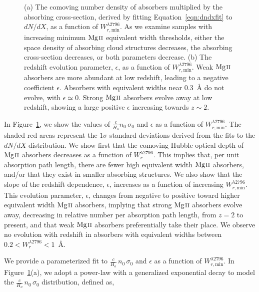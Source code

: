 \documentclass[iop,apj,numberedappendix,appendixfloats,twocolappendix]{emulateapj}
\begin{document}
\begin{figure*}[bth]
\caption{(a) The comoving number density of absorbers multiplied by the absorbing cross-section, derived by fitting Equation~\ref{eqn:dndxfit} to $dN\!/dX$, as a function of $W_{r,\mathrm{min}}^{\lambda2796}$. As we examine samples with increasing minimum ${\hbox{{\rm Mg}\kern 0.1em{\sc ii}}}$ equivalent width thresholds, either the space density of absorbing cloud structures decreases, the absorbing cross-section decreases, or both parameters decrease. (b) The redshift evolution parameter, $\epsilon$, as a function of $W_{r,\mathrm{min}}^{\lambda2796}$. Weak ${\hbox{{\rm Mg}\kern 0.1em{\sc ii}}}$ absorbers are more abundant at low redshift, leading to a negative coefficient $\epsilon$. Absorbers with equivalent widths near $0.3$~{\AA} do not evolve, with $\epsilon \simeq 0$. Strong ${\hbox{{\rm Mg}\kern 0.1em{\sc ii}}}$ absorbers evolve away at low redshift, showing a large positive $\epsilon$ increasing towards $z \sim 2$.}
\label{fig:nsigmaepsilon}
\end{figure*}

In Figure~\ref{fig:nsigmaepsilon}, we show the values of $\frac{c}{H_o}n_0\,\sigma_0$ and $\epsilon$ as a function of $W_{r,\mathrm{min}}^{\lambda2796}$. The shaded red areas represent the $1\sigma$ standard deviations derived from the fits to the $dN\!/dX$ distribution. We show first that the comoving Hubble optical depth of ${\hbox{{\rm Mg}\kern 0.1em{\sc ii}}}$ absorbers decreases as a function of $W_r^{\lambda2796}$. This implies that, per unit absorption path length, there are fewer high equivalent width ${\hbox{{\rm Mg}\kern 0.1em{\sc ii}}}$ absorbers, and/or that they exist in smaller absorbing structures. We also show that the slope of the redshift dependence, $\epsilon$, increases as a function of increasing $W_{r,\mathrm{min}}^{\lambda2796}$. This evolution parameter, $\epsilon$, changes from negative to positive toward higher equivalent width ${\hbox{{\rm Mg}\kern 0.1em{\sc ii}}}$ absorbers, implying that strong ${\hbox{{\rm Mg}\kern 0.1em{\sc ii}}}$ absorbers evolve away, decreasing in relative number per absorption path length, from $z = 2$ to present, and that weak ${\hbox{{\rm Mg}\kern 0.1em{\sc ii}}}$ absorbers preferentially take their place. We observe no evolution with redshift in absorbers with equivalent widths between $0.2 < W_r^{\lambda2796} < 1$~{\AA}.

We provide a parameterized fit to $\frac{c}{H_o}\,n_0\,\sigma_0$ and $\epsilon$ as a function of $W_{r,\mathrm{min}}^{\lambda2796}$. In Figure~\ref{fig:nsigmaepsilon}(a), we adopt a power-law with a generalized exponential decay to model the $\frac{c}{H_o}\,n_0\,\sigma_0$ distribution, defined as,
\end{document}
